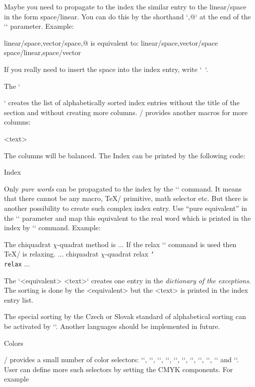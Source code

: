 Maybe you need to propagate to the index the similar entry to the
linear/space in the form space/linear. You can do this by the shorthand `,@`
at the end of the `\ii` parameter. Example:

\begtt
\ii linear/space,vector/space,@
is equivalent to:
\ii linear/space,vector/space \ii space/linear,space/vector
\endtt

If you really need to insert the space into the index entry, write `~`.

The `\makeindex` creates the list of alphabetically sorted index entries
without the title of the section and without creating more columns. \OpTeX/
provides another macros for more columns: 

\begtt
{}
<text>
\endmulti
\endtt

The columns will be balanced. The Index can be printed by the following
code:

\begtt
\sec Index\par
{} \makeindex \endmulti
\endtt

Only {\em pure words} can be propagated to the index by the `\ii` command. It
means that there cannot be any macro, \TeX/ primitive, math selector etc.
But there is another possibility to create such complex index entry. Use
``pure equivalent'' in the `\ii` parameter and map this equivalent to the
real word which is printed in the index by `\iis` command. Example:

\begtt
The \ii chiquadrat $\chi$-quadrat method is 
...
If the \ii relax `\relax` command is used then \TeX/ is relaxing.
...
\iis chiquadrat {$\chi$-quadrat}
\iis relax {{\tt \char`\\relax}}
...
\endtt

The `\iis <equivalent> {<text>}` creates one entry in the {\em dictionary 
of the exceptions}. The sorting is done by the <equivalent> but the
<text> is printed in the index entry list.

The special sorting by the Czech or Slovak standard of alphabetical sorting
can be activated by `\cssort`. Another languages should be implemented in
future.


\sec Colors

\OpTeX/ provides a small number of color selectors: 
{\localcolor\Blue `\Blue`}, 
{\localcolor\Red `\Red`}, 
{\localcolor\Brown `\Brown`},
{\localcolor\Green `\Green`}, 
{\localcolor\Yellow `\Yellow`}, 
{\localcolor\Cyan `\Cyan`}, 
{\localcolor\Magenta `\Magenta`}, 
{`\White`}, 
{\localcolor\Grey `\Grey`}, 
{\localcolor\LightGrey `\LightGrey`} and
`\Black`. User can define more
such selectors by setting the CMYK components. For example

